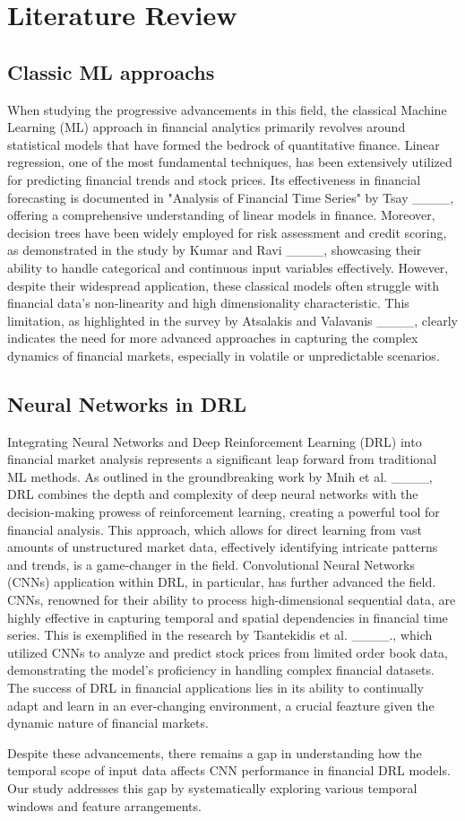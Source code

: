 \section{Literature Review}
\label{sec:litriv}

\subsection{Classic ML approachs}
When studying the progressive advancements in this field, the classical Machine Learning (ML) approach in financial analytics primarily revolves around statistical models that have formed the bedrock of quantitative finance. Linear regression, one of the most fundamental techniques, has been extensively utilized for predicting financial trends and stock prices. Its effectiveness in financial forecasting is documented in "Analysis of Financial Time Series" by Tsay ____, offering a comprehensive understanding of linear models in finance. Moreover, decision trees have been widely employed for risk assessment and credit scoring, as demonstrated in the study by Kumar and Ravi ____, showcasing their ability to handle categorical and continuous input variables effectively. However, despite their widespread application, these classical models often struggle with financial data's non-linearity and high dimensionality characteristic. This limitation, as highlighted in the survey by Atsalakis and Valavanis ____, clearly indicates the need for more advanced approaches in capturing the complex dynamics of financial markets, especially in volatile or unpredictable scenarios.

\subsection{Neural Networks in DRL}
Integrating Neural Networks and Deep Reinforcement Learning (DRL) into financial market analysis represents a significant leap forward from traditional ML methods. As outlined in the groundbreaking work by Mnih et al. ____, DRL combines the depth and complexity of deep neural networks with the decision-making prowess of reinforcement learning, creating a powerful tool for financial analysis. This approach, which allows for direct learning from vast amounts of unstructured market data, effectively identifying intricate patterns and trends, is a game-changer in the field. Convolutional Neural Networks (CNNs) application within DRL, in particular, has further advanced the field. CNNs, renowned for their ability to process high-dimensional sequential data, are highly effective in capturing temporal and spatial dependencies in financial time series. This is exemplified in the research by Tsantekidis et al. ____., which utilized CNNs to analyze and predict stock prices from limited order book data, demonstrating the model's proficiency in handling complex financial datasets. The success of DRL in financial applications lies in its ability to continually adapt and learn in an ever-changing environment, a crucial feazture given the dynamic nature of financial markets. 

Despite these advancements, there remains a gap in understanding how the temporal scope of input data affects CNN performance in financial DRL models. Our study addresses this gap by systematically exploring various temporal windows and feature arrangements.